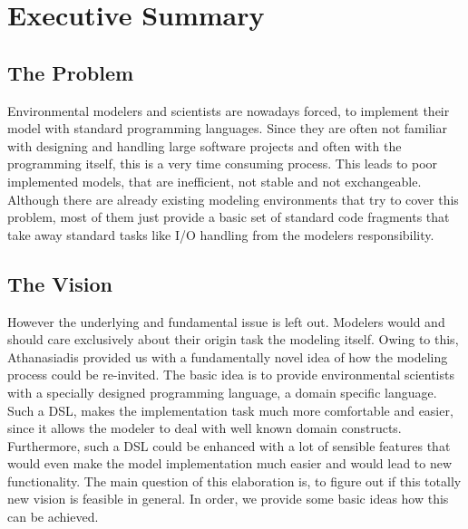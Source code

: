 \chapter*{Executive Summary}
\section*{The Problem}
\par
Environmental modelers and scientists are nowadays forced, to implement their model with standard programming languages. Since they are often not familiar with designing and handling large software projects and often with the programming itself, this is a very time consuming process. This leads to poor implemented models, that are inefficient, not stable and not exchangeable.
\\
Although there are already existing modeling environments that try to cover this problem, most of them just provide a basic set of standard code fragments that take away standard tasks like I/O handling from the modelers responsibility.

\section*{The Vision}
\par
However the underlying and fundamental issue is left out. Modelers would and should care exclusively about their origin task the modeling itself. Owing to this, Athanasiadis provided us with a fundamentally novel idea of how the modeling process could be re-invited. The basic idea is to provide environmental scientists with a specially designed programming language, a domain specific language. Such a DSL, makes the implementation task much more comfortable and easier, since it allows the modeler to deal with well known domain constructs. Furthermore, such a DSL could be enhanced with a lot of sensible features that would even make the model implementation much easier and would lead to new functionality. The main question of this elaboration is, to figure out if this totally new vision is feasible in general. In order, we provide some basic ideas how this can be achieved.

